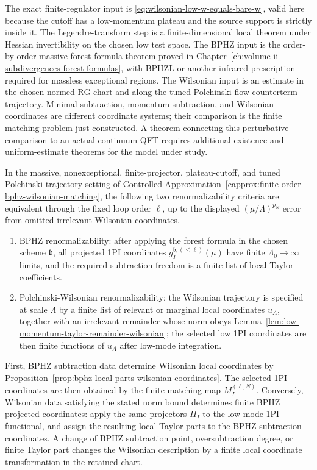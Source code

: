 \begin{remark}
The exact finite-regulator input is
\eqref{eq:wilsonian-low-w-equals-bare-w}, valid here because the cutoff has a
low-momentum plateau and the source support is strictly inside it.  The
Legendre-transform step is a finite-dimensional local theorem under Hessian
invertibility on the chosen low test space.  The BPHZ input is the
order-by-order massive forest-formula theorem proved in
Chapter~\ref{ch:volume-ii-subdivergences-forest-formulas}, with BPHZL or
another infrared prescription required for massless exceptional regions.  The
Wilsonian input is an estimate in the chosen normed RG chart and along the
tuned Polchinski-flow counterterm trajectory.  Minimal subtraction, momentum
subtraction, and Wilsonian coordinates are different coordinate systems; their
comparison is the finite matching problem just constructed.  A theorem
connecting this perturbative comparison to an actual continuum QFT requires
additional existence and uniform-estimate theorems for the model under study.
\end{remark}

\begin{remark}
\label{rem:fixed-loop-bphz-polchinski-renormalizability}
In the massive, nonexceptional, finite-projector, plateau-cutoff, and tuned
Polchinski-trajectory setting of
Controlled Approximation~\ref{capprox:finite-order-bphz-wilsonian-matching},
the following two renormalizability criteria are equivalent through the fixed
loop order \(\ell\), up to the displayed
\((\mu/\Lambda)^{p_N}\) error from omitted irrelevant Wilsonian coordinates.
\begin{enumerate}[label=(\roman*)]
  \item BPHZ renormalizability: after applying the forest formula in the
  chosen scheme \(\mathfrak b\), all projected 1PI coordinates
  \(g_I^{\mathfrak b,(\leq\ell)}(\mu)\) have finite
  \(\Lambda_0\to\infty\) limits, and the required subtraction freedom is a
  finite list of local Taylor coefficients.
  \item Polchinski-Wilsonian renormalizability: the Wilsonian trajectory is
  specified at scale \(\Lambda\) by a finite list of relevant or marginal local
  coordinates \(u_A\), together with an irrelevant remainder whose norm obeys
  Lemma~\ref{lem:low-momentum-taylor-remainder-wilsonian}; the selected low
  1PI coordinates are then finite functions of \(u_A\) after low-mode
  integration.
\end{enumerate}
First, BPHZ subtraction data determine Wilsonian local coordinates by
Proposition~\ref{prop:bphz-local-parts-wilsonian-coordinates}.  The selected
1PI coordinates are then obtained by the finite matching map
\(M_I^{(\ell,N)}\).  Conversely, Wilsonian data satisfying the stated norm
bound determines finite BPHZ projected coordinates: apply the same projectors
\(\Pi_I\) to the low-mode 1PI functional, and assign the resulting local Taylor
parts to the BPHZ subtraction coordinates.  A change of BPHZ subtraction point,
oversubtraction degree, or finite Taylor part changes the Wilsonian description
by a finite local coordinate transformation in the retained chart.
\end{remark}


